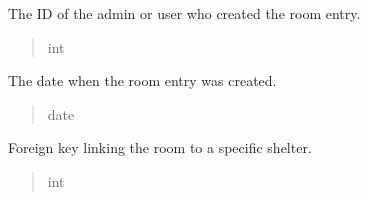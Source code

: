 \documentclass[letterpaper,10pt,english]{sphinxmanual}
\begin{document}
\begin{fulllineitems}
\begin{fulllineitems}
\label{\detokenize{app.mysql:app.mysql.room.Room.createdBy}}
\pysigstartsignatures
\pysigline
{}
\pysigstopsignatures
\sphinxAtStartPar
The ID of the admin or user who created the room entry.
\begin{quote}\begin{description}
\sphinxAtStartPar
int

\end{description}\end{quote}

\end{fulllineitems}


\begin{fulllineitems}
\label{\detokenize{app.mysql:app.mysql.room.Room.createDate}}
\pysigstartsignatures
\pysigline
{}
\pysigstopsignatures
\sphinxAtStartPar
The date when the room entry was created.
\begin{quote}\begin{description}
\sphinxAtStartPar
date

\end{description}\end{quote}

\end{fulllineitems}


\begin{fulllineitems}
\label{\detokenize{app.mysql:app.mysql.room.Room.idShelter}}
\pysigstartsignatures
\pysigline
{}
\pysigstopsignatures
\sphinxAtStartPar
Foreign key linking the room to a specific shelter.
\begin{quote}\begin{description}
\sphinxAtStartPar
int

\end{description}\end{quote}

\end{fulllineitems}



\end{fulllineitems}
\end{document}
